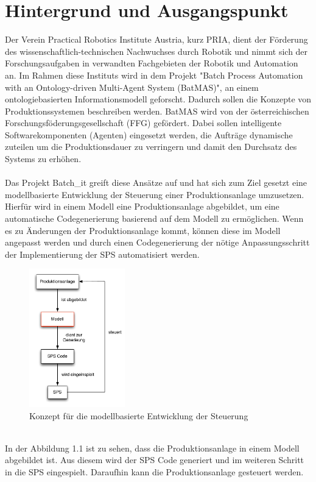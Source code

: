 \section{Hintergrund und Ausgangspunkt}
Der Verein Practical Robotics Institute Austria, kurz PRIA, dient der Förderung des wissenschaftlich-technischen Nachwuchses durch Robotik und nimmt sich der Forschungsaufgaben in verwandten Fachgebieten der Robotik und Automation an.
Im Rahmen diese Instituts wird in dem Projekt "Batch Process Automation with an On\-to\-lo\-gy-driven Multi-Agent System (BatMAS)", an einem ontologiebasierten Informationsmodell geforscht. Dadurch sollen die Konzepte von Produktionssystemen  beschreiben werden. BatMAS wird von  der österreichischen Forschungsföderungsgesellschaft (FFG) gefördert. Dabei sollen intelligente Softwarekomponenten (Agenten) eingesetzt werden, die Aufträge dynamische zuteilen um die Produktionsdauer zu verringern und damit den Durchsatz des Systems zu erhöhen.\\\\
Das Projekt Batch\_it greift diese Ansätze auf und hat sich zum Ziel gesetzt eine modellbasierte Entwicklung der Steuerung einer Produktionsanlage umzusetzen. Hierfür wird in einem Modell eine Produktionsanlage abgebildet, um eine automatische Codegenerierung basierend auf dem Modell zu ermöglichen. Wenn es zu Änderungen der Produktionsanlage kommt, können diese im Modell angepasst werden und durch einen Codegenerierung der nötige Anpassungsschritt der Implementierung der SPS automatisiert werden.
\begin{figure}[h!]
		\centering
		\includegraphics[width=0.37\textwidth]{graphics/konzept/konzept.pdf}
		\caption{Konzept für die modellbasierte Entwicklung der Steuerung}
\end{figure} \\
In der Abbildung 1.1 ist zu sehen, dass die Produktionsanlage in einem Modell abgebildet ist. Aus diesem wird der SPS Code generiert und im weiteren Schritt in die SPS eingespielt. Daraufhin kann die Produktionsanlage gesteuert werden. 

